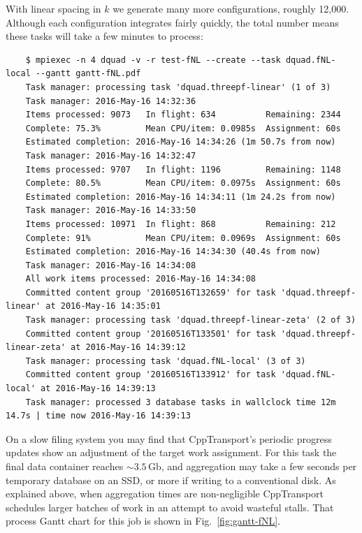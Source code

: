 \documentclass[11pt,a4paper]{article}
\newcommand{\packagefont}{\sffamily}
\newcommand{\CppTransport}{{\packagefont CppTransport}}
\newcommand{\Gb}{\,\mathrm{Gb}}
\begin{document}
With linear spacing in $k$ we generate many more configurations,
roughly 12,000.
Although each configuration integrates fairly quickly, the
total number means these tasks will take a few minutes to process:
\begin{verbatim}
    $ mpiexec -n 4 dquad -v -r test-fNL --create --task dquad.fNL-local --gantt gantt-fNL.pdf
    Task manager: processing task 'dquad.threepf-linear' (1 of 3)
    Task manager: 2016-May-16 14:32:36
    Items processed: 9073   In flight: 634          Remaining: 2344         
    Complete: 75.3%         Mean CPU/item: 0.0985s  Assignment: 60s         
    Estimated completion: 2016-May-16 14:34:26 (1m 50.7s from now)                  
    Task manager: 2016-May-16 14:32:47
    Items processed: 9707   In flight: 1196         Remaining: 1148         
    Complete: 80.5%         Mean CPU/item: 0.0975s  Assignment: 60s         
    Estimated completion: 2016-May-16 14:34:11 (1m 24.2s from now)                  
    Task manager: 2016-May-16 14:33:50
    Items processed: 10971  In flight: 868          Remaining: 212          
    Complete: 91%           Mean CPU/item: 0.0969s  Assignment: 60s         
    Estimated completion: 2016-May-16 14:34:30 (40.4s from now)                     
    Task manager: 2016-May-16 14:34:08
    All work items processed: 2016-May-16 14:34:08                                  
    Committed content group '20160516T132659' for task 'dquad.threepf-linear' at 2016-May-16 14:35:01
    Task manager: processing task 'dquad.threepf-linear-zeta' (2 of 3)
    Committed content group '20160516T133501' for task 'dquad.threepf-linear-zeta' at 2016-May-16 14:39:12
    Task manager: processing task 'dquad.fNL-local' (3 of 3)
    Committed content group '20160516T133912' for task 'dquad.fNL-local' at 2016-May-16 14:39:13
    Task manager: processed 3 database tasks in wallclock time 12m 14.7s | time now 2016-May-16 14:39:13
\end{verbatim}
On a slow filing system you may find that
{\CppTransport}'s
periodic progress updates
show an adjustment of the target work assignment.
For this task the final data container reaches $\sim 3.5 \Gb$, and aggregation
may take a few seconds per temporary database on an SSD,
or more if writing to a conventional disk.
As explained above,
when aggregation times are non-negligible
{\CppTransport} schedules larger batches of work in an attempt
to avoid wasteful stalls.
That process Gantt chart for this job is shown
in Fig.~\ref{fig:gantt-fNL}.
\end{document}
